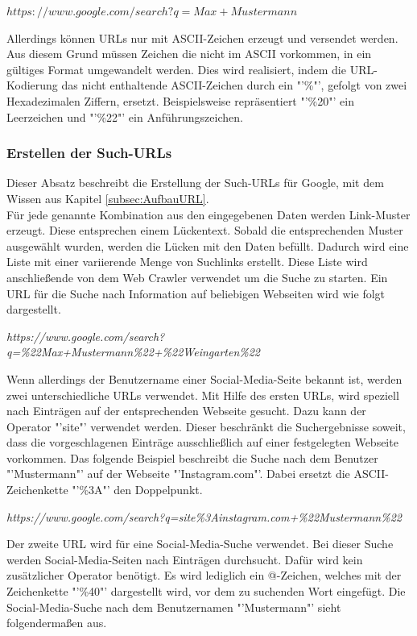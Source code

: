 			$https://www.google.com/search?q=Max+Mustermann$
			
			Allerdings können URLs nur mit ASCII-Zeichen erzeugt und versendet werden. Aus diesem Grund müssen Zeichen die nicht im ASCII vorkommen, in ein gültiges Format umgewandelt werden. Dies wird realisiert, indem die URL-Kodierung das nicht enthaltende ASCII-Zeichen durch ein "'\%"', gefolgt von zwei Hexadezimalen Ziffern, ersetzt. Beispielsweise repräsentiert "'\%20"' ein Leerzeichen und "'\%22"' ein Anführungszeichen. \cite{HTMLURL} \\
			
			\subsubsection{Erstellen der Such-URLs}
			Dieser Absatz beschreibt die Erstellung der Such-URLs für Google, mit dem Wissen aus Kapitel \ref{subsec:AufbauURL}.\\
			Für jede genannte Kombination aus den eingegebenen Daten werden Link-Muster erzeugt. Diese entsprechen einem Lückentext. Sobald die entsprechenden Muster ausgewählt wurden, werden die Lücken mit den Daten befüllt. Dadurch wird eine Liste mit einer variierende Menge von Suchlinks erstellt. Diese Liste wird anschließende von dem Web Crawler verwendet um die Suche zu starten.
			Ein URL für die Suche nach Information auf beliebigen Webseiten wird wie folgt dargestellt.
					
			\textit{https://www.google.com/search?q=\%22Max+Mustermann\%22+\%22Weingarten\%22}
			
			Wenn allerdings der Benutzername einer Social-Media-Seite bekannt ist, werden zwei unterschiedliche URLs verwendet. Mit Hilfe des ersten URLs, wird speziell nach Einträgen auf der entsprechenden Webseite gesucht. Dazu kann der Operator "'site"' verwendet werden. Dieser beschränkt die Suchergebnisse soweit, dass die vorgeschlagenen Einträge ausschließlich auf einer festgelegten Webseite vorkommen. Das folgende Beispiel beschreibt die Suche nach dem Benutzer "'Mustermann"' auf der Webseite "'Instagram.com"'. Dabei ersetzt die ASCII-Zeichenkette "'\%3A"' den Doppelpunkt. \cite{HTMLURL}
			
			\textit{https://www.google.com/search?q=site\%3Ainstagram.com+\%22Mustermann\%22}
			
			Der zweite URL wird für eine Social-Media-Suche verwendet. Bei dieser Suche werden Social-Media-Seiten nach Einträgen durchsucht. Dafür wird kein zusätzlicher Operator benötigt. Es wird lediglich ein @-Zeichen, welches mit der Zeichenkette "'\%40"' dargestellt wird, vor dem zu suchenden Wort eingefügt. Die Social-Media-Suche nach dem Benutzernamen "'Mustermann"' sieht folgendermaßen aus.\cite{SocialMediaSearch}
			
